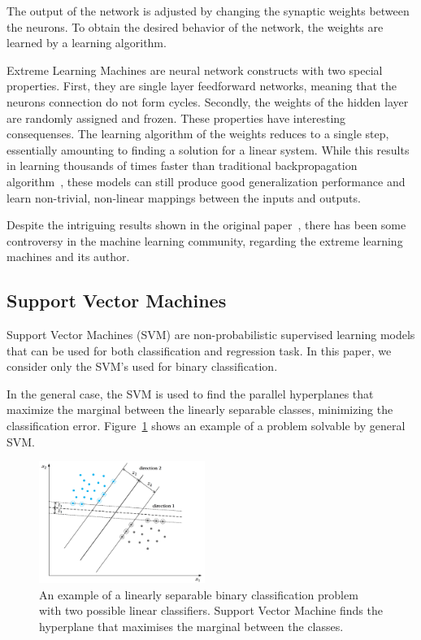 The output of the network is adjusted by changing the synaptic weights between the neurons. To obtain the desired behavior of the network, the  weights are learned by a learning algorithm.~\cite{haykin:2009:neural-networks}

Extreme Learning Machines are neural network constructs with two special properties. First, they are single layer feedforward networks, meaning that the neurons connection do not form cycles. Secondly, the weights of the hidden layer are randomly assigned and frozen. These properties have interesting consequenses. The learning algorithm of the weights reduces to a single step, essentially amounting to finding a solution for a linear system. While this results in learning thousands of times faster than traditional backpropagation algorithm~\cite{haykin:2009:neural-networks}, these models can still produce good generalization performance and learn non-trivial, non-linear mappings between the inputs and outputs.~\cite{huang:2006:elm}

Despite the intriguing results shown in the original paper~\cite{huang:2006:elm}, there has been some controversy in the machine learning community, regarding the extreme learning machines and its author.~\cite{reddit:2015:elm-controversy}

\subsection{Support Vector Machines}
Support Vector Machines (SVM) are non-probabilistic supervised learning models that can be used for both classification and regression task. In this paper, we consider only the SVM's used for binary classification.

In the general case, the SVM is used to find the parallel hyperplanes that maximize the marginal between the linearly separable classes, minimizing the classification error. Figure~\ref{fig:support-vector-machine-linear} shows an example of a problem solvable by general SVM.~\cite{theodoridis:2009:pattern-recognition}

\begin{figure}[H]
\centering
\includegraphics[width=0.48\textwidth]{images/support-vector-machine-linear.pdf}
\caption{An example of a linearly separable binary classification problem with two possible linear classifiers. Support Vector Machine finds the hyperplane that maximises the marginal between the classes.~\cite{theodoridis:2009:pattern-recognition}}
\label{fig:support-vector-machine-linear}
\end{figure}

